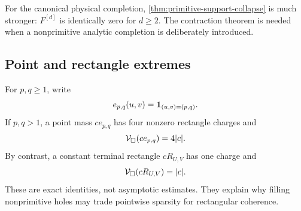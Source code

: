 \begin{remark}
For the canonical physical completion,
\cref{thm:primitive-support-collapse} is much stronger:
\(F^{[d]}\) is identically zero for \(d\ge2\).  The contraction theorem is
needed when a nonprimitive analytic completion is deliberately introduced.
\end{remark}

\subsection{Point and rectangle extremes}

For \(p,q\ge1\), write
\[
 e_{p,q}(u,v)=\mathbf 1_{(u,v)=(p,q)}.
\]
If \(p,q>1\), a point mass \(ce_{p,q}\) has four nonzero rectangle charges
and
\[
 \mathcal V_\square(ce_{p,q})=4|c|.
\]
By contrast, a constant terminal rectangle \(cR_{U,V}\) has one charge and
\[
 \mathcal V_\square(cR_{U,V})=|c|.
\]
These are exact identities, not asymptotic estimates.  They explain why
filling nonprimitive holes may trade pointwise sparsity for rectangular
coherence.
